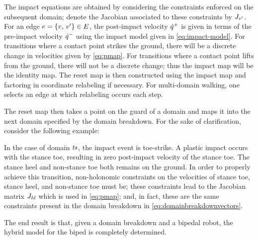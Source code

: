 The impact equations are obtained by considering the constraints enforced on the
subsequent domain;
%
denote the Jacobian associated to these constraints by $J_{v'}$.
%
For an edge $e = \{v, \, v'\} \in E$, the post-impact velocity $\dot{q}^{+}$ is given
in terms of the pre-impact velocity $\dot{q}^{-}$ using the impact model given in
\eqref{eq:impact-model}.
%
For transitions where a contact point strikes the ground, there will be a
discrete change in velocities given by \eqref{eq:pmap}.
%
For transitions where a contact point lifts from the ground, there will not be a
discrete change;
%
thus the impact map will be the identity map.
%
The reset map is then constructed using the impact map and factoring in
coordinate relabeling if necessary.
%
For multi-domain walking, one selects an edge at which relabeling occurs each
step.

The reset map then takes a point on the guard of a domain and maps it into the next domain
specified by the domain breakdown.
%
For the sake of clarification, consider the following example:
%
\begin{exmp}
  In the case of domain $\mathit{ts}$, the impact event is toe-strike.
  A plastic impact occurs with the stance toe, resulting in zero post-impact
  velocity of the stance toe.
  The stance heel and non-stance toe both remains on the ground.
  In order to properly achieve this transition, non-holonomic constraints on the
  velocities of stance toe, stance heel, and non-stance toe must be;
  these constraints lead to the Jacobian matrix $J_{\mathit{hl}}$ which is used in
  \eqref{eq:pmap};
  and, in fact, these are the same constraints present in the domain breakdown
  in \eqref{eq:domainbreakdownvectors}.
\end{exmp}


The end result is that, given a domain breakdown and a bipedal robot, the hybrid
model for the biped is completely determined.
%
